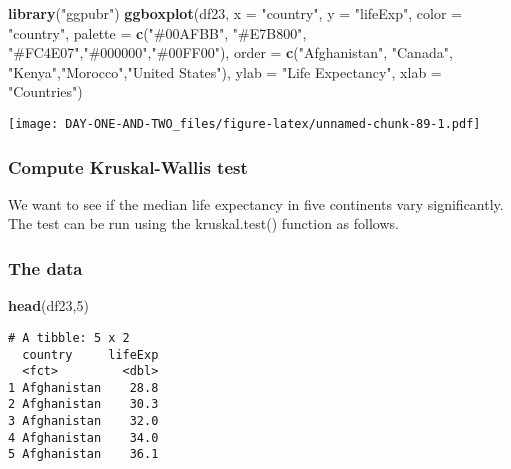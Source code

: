 \documentclass[
]{article}
\newenvironment{Shaded}{\begin{snugshade}}{\end{snugshade}}
\newcommand{\AttributeTok}[1]{\textcolor[rgb]{0.13,0.29,0.53}{#1}}
\newcommand{\DecValTok}[1]{\textcolor[rgb]{0.00,0.00,0.81}{#1}}
\newcommand{\FunctionTok}[1]{\textcolor[rgb]{0.13,0.29,0.53}{\textbf{#1}}}
\newcommand{\NormalTok}[1]{#1}
\newcommand{\StringTok}[1]{\textcolor[rgb]{0.31,0.60,0.02}{#1}}
\begin{document}
\begin{Shaded}
\begin{Highlighting}[]
\FunctionTok{library}\NormalTok{(}\StringTok{"ggpubr"}\NormalTok{)}
\FunctionTok{ggboxplot}\NormalTok{(df23, }\AttributeTok{x =} \StringTok{"country"}\NormalTok{, }\AttributeTok{y =} \StringTok{"lifeExp"}\NormalTok{,}
          \AttributeTok{color =} \StringTok{"country"}\NormalTok{, }\AttributeTok{palette =} \FunctionTok{c}\NormalTok{(}\StringTok{"\#00AFBB"}\NormalTok{, }\StringTok{"\#E7B800"}\NormalTok{, }\StringTok{"\#FC4E07"}\NormalTok{,}\StringTok{"\#000000"}\NormalTok{,}\StringTok{"\#00FF00"}\NormalTok{),}
          \AttributeTok{order =} \FunctionTok{c}\NormalTok{(}\StringTok{"Afghanistan"}\NormalTok{, }\StringTok{"Canada"}\NormalTok{, }\StringTok{"Kenya"}\NormalTok{,}\StringTok{"Morocco"}\NormalTok{,}\StringTok{"United States"}\NormalTok{),}
          \AttributeTok{ylab =} \StringTok{"Life Expectancy"}\NormalTok{, }\AttributeTok{xlab =} \StringTok{"Countries"}\NormalTok{)}
\end{Highlighting}
\end{Shaded}

\texttt{[image: DAY-ONE-AND-TWO\_files/figure-latex/unnamed-chunk-89-1.pdf]}

\hypertarget{compute-kruskal-wallis-test}{%
\subsubsection{Compute Kruskal-Wallis
test}\label{compute-kruskal-wallis-test}}

We want to see if the median life expectancy in five continents vary
significantly. The test can be run using the kruskal.test() function as
follows.

\hypertarget{the-data-2}{%
\subsubsection{The data}\label{the-data-2}}

\begin{Shaded}
\begin{Highlighting}[]
\FunctionTok{head}\NormalTok{(df23,}\DecValTok{5}\NormalTok{)}
\end{Highlighting}
\end{Shaded}

\begin{verbatim}
# A tibble: 5 x 2
  country     lifeExp
  <fct>         <dbl>
1 Afghanistan    28.8
2 Afghanistan    30.3
3 Afghanistan    32.0
4 Afghanistan    34.0
5 Afghanistan    36.1
\end{verbatim}
\end{document}
